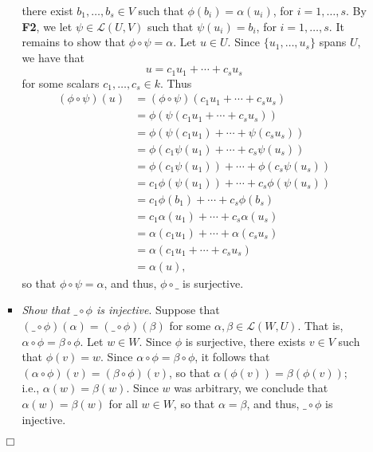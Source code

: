 \documentclass[9pt]{article}
\newcommand{\qed}{\hfill \ensuremath{\Box}}
\begin{document}
\begin{enumerate}
\begin{enumerate}
\begin{itemize}
                        there exist $b_1, \ldots, b_s \in V$ such that
                        $\phi(b_i) = \alpha(u_i)$, for $i = 1, \ldots, s$. By
                        \textbf{F2}, we let $\psi \in \mathcal{L}(U, V)$ such
                        that $\psi(u_i) = b_i$, for $i = 1, \ldots, s$. It
                        remains to show that $\phi\circ\psi = \alpha$. Let
                        $u \in U$. Since $\{u_1, \ldots, u_s\}$ spans $U$, we
                        have that
                        $$u = c_1u_1 + \cdots + c_su_s$$
                        for some scalars $c_1, \ldots, c_s \in k$. Thus
                        \begin{align*}
                           (\phi\circ\psi)(u) &= (\phi\circ\psi)(
                              c_1u_1 + \cdots + c_su_s) \\
                              &= \phi(\psi(c_1u_1 + \cdots + c_su_s)) \\
                              &= \phi(\psi(c_1u_1) + \cdots + \psi(c_su_s)) \\
                              &= \phi(c_1\psi(u_1) + \cdots + c_s\psi(u_s)) \\
                              &= \phi(c_1\psi(u_1))+\cdots+\phi(c_s\psi(u_s)) \\
                              &= c_1\phi(\psi(u_1))+\cdots+c_s\phi(\psi(u_s)) \\
                              &= c_1\phi(b_1)+\cdots+c_s\phi(b_s) \\
                              &= c_1\alpha(u_1)+\cdots+c_s\alpha(u_s) \\
                              &= \alpha(c_1u_1)+\cdots+\alpha(c_su_s) \\
                              &= \alpha(c_1u_1+\cdots+c_su_s) \\
                              &= \alpha(u),
                        \end{align*}
                        so that $\phi\circ\psi = \alpha$, and thus,
                        $\phi\circ\_$ is surjective.
                  \item \textit{Show that $\_\circ\phi$ is injective}. Suppose
                        that $(\_\circ\phi)(\alpha) = (\_\circ\phi)(\beta)$ for
                        some $\alpha, \beta \in \mathcal{L}(W, U)$. That is,
                        $\alpha\circ\phi = \beta\circ\phi$. Let $w \in W$. Since
                        $\phi$ is surjective, there exists $v \in V$ such that
                        $\phi(v) = w$. Since $\alpha\circ\phi = \beta\circ\phi$,
                        it follows that
                        $(\alpha\circ\phi)(v) = (\beta\circ\phi)(v)$, so that
                        $\alpha(\phi(v)) = \beta(\phi(v))$; i.e.,
                        $\alpha(w) = \beta(w)$. Since $w$ was arbitrary, we
                        conclude that $\alpha(w) = \beta(w)$ for all $w \in W$,
                        so that $\alpha = \beta$, and thus, $\_\circ\phi$ is
                        injective.
               \end{itemize} \qed     
      \end{enumerate}
\end{enumerate}
\end{document}
